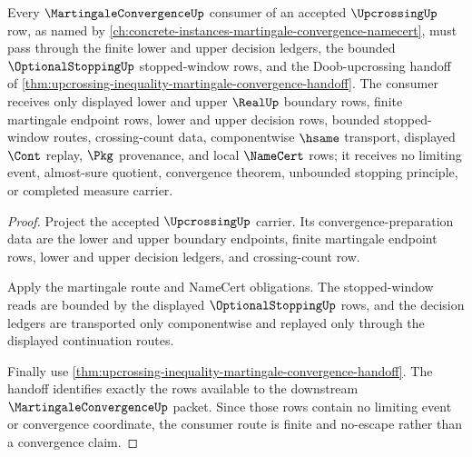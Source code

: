 \begin{theorem}
\label{thm:upcrossing-martingale-convergence-consumer}
Every $\MartingaleConvergenceUp$ consumer of an accepted $\UpcrossingUp$ row, as named by \autoref{ch:concrete-instances-martingale-convergence-namecert}, must pass through the finite lower and upper decision ledgers, the bounded $\OptionalStoppingUp$ stopped-window rows, and the Doob-upcrossing handoff of \autoref{thm:upcrossing-inequality-martingale-convergence-handoff}. The consumer receives only displayed lower and upper $\RealUp$ boundary rows, finite martingale endpoint rows, lower and upper decision rows, bounded stopped-window routes, crossing-count data, componentwise $\hsame$ transport, displayed $\Cont$ replay, $\Pkg$ provenance, and local $\NameCert$ rows; it receives no limiting event, almost-sure quotient, convergence theorem, unbounded stopping principle, or completed measure carrier.
\end{theorem}
\begin{proof}
Project the accepted $\UpcrossingUp$ carrier. Its convergence-preparation data are the lower and upper boundary endpoints, finite martingale endpoint rows, lower and upper decision ledgers, and crossing-count row.

Apply the martingale route and NameCert obligations. The stopped-window reads are bounded by the displayed $\OptionalStoppingUp$ rows, and the decision ledgers are transported only componentwise and replayed only through the displayed continuation routes.

Finally use \autoref{thm:upcrossing-inequality-martingale-convergence-handoff}. The handoff identifies exactly the rows available to the downstream $\MartingaleConvergenceUp$ packet. Since those rows contain no limiting event or convergence coordinate, the consumer route is finite and no-escape rather than a convergence claim.
\end{proof}

